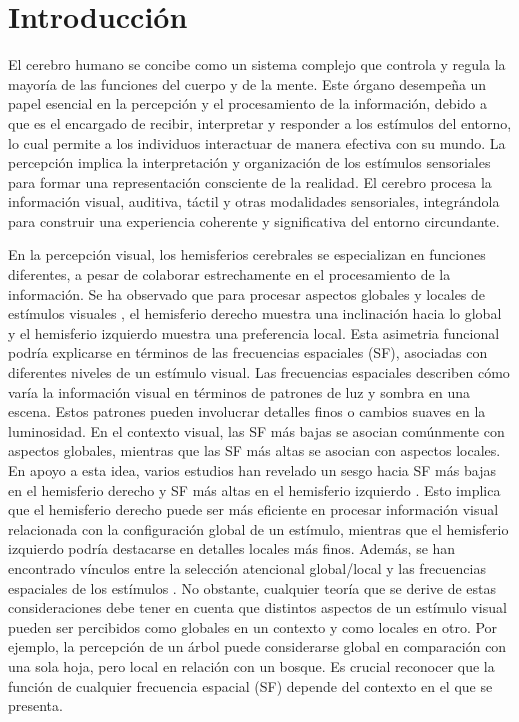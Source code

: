 \documentclass{article}
\title{}
\author{Mari\'e del Valle Reyes}
\date{C411}
\begin{document}
	
	\maketitle
	
	\section*{Introducci\'on}
	El cerebro humano se concibe como un sistema complejo que controla y regula la mayoría de las funciones del cuerpo y de la mente. Este \'organo desempeña un papel esencial en la percepción y el procesamiento de la información, debido a que es el encargado de recibir, interpretar y responder a los estímulos del entorno, lo cual permite a los individuos interactuar de manera efectiva con su mundo. La percepción implica la interpretación y organización de los estímulos sensoriales para formar una representación consciente de la realidad. El cerebro procesa la información visual, auditiva, táctil y otras modalidades sensoriales, integrándola para construir una experiencia coherente y significativa del entorno circundante.
	
	En la percepci\'on visual, los hemisferios cerebrales se especializan en funciones diferentes, a pesar de colaborar estrechamente en el procesamiento de la informaci\'on. Se ha observado que para procesar aspectos globales y locales de estímulos visuales \cite{flevaris_spatial_2016}, el hemisferio derecho muestra una inclinaci\'on hacia lo global y el hemisferio izquierdo muestra una preferencia local. Esta asimetria funcional podría explicarse en términos de las frecuencias espaciales (SF), asociadas con diferentes niveles de un estímulo visual. Las frecuencias espaciales describen cómo varía la información visual en términos de patrones de luz y sombra en una escena. Estos patrones pueden involucrar detalles finos o cambios suaves en la luminosidad. En el contexto visual, las SF más bajas se asocian comúnmente con aspectos globales, mientras que las SF más altas se asocian con aspectos locales. En apoyo a esta idea, varios estudios han revelado un sesgo hacia SF más bajas en el hemisferio derecho y SF más altas en el hemisferio izquierdo \cite{flevaris_spatial_2016}. Esto implica que el hemisferio derecho puede ser más eficiente en procesar información visual relacionada con la configuración global de un estímulo, mientras que el hemisferio izquierdo podría destacarse en detalles locales más finos.  Además, se han encontrado vínculos entre la selección atencional global/local y las frecuencias espaciales de los est\'imulos \cite{flevaris_spatial_2016}. No obstante, cualquier teoría que se derive de estas consideraciones debe tener en cuenta que distintos aspectos de un estímulo visual pueden ser percibidos como globales en un contexto y como locales en otro. Por ejemplo, la percepción de un árbol puede considerarse global en comparación con una sola hoja, pero local en relación con un bosque. Es crucial reconocer que la función de cualquier frecuencia espacial (SF) depende del contexto en el que se presenta.
	
\end{document}
